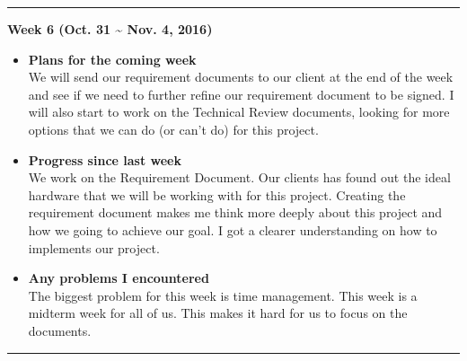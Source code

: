 		\rule{\textwidth}{0.5pt}

		\begin{center}
			\textbf{Week 6 (Oct. 31 {\textasciitilde{}} Nov. 4, 2016)}
		\end{center}
		\begin{itemize}
			\item \textbf{Plans for the coming week}
			\\We will send our requirement documents to our client at the end of the week and see if we need to further refine our requirement document to be signed. I will also start to work on the Technical Review documents, looking for more options that we can do (or can't do) for this project.\\

			\item \textbf{Progress since last week}
			\\We work on the Requirement Document. Our clients has found out the ideal hardware that we will be working with for this project. Creating the requirement document makes me think more deeply about this project and how we going to achieve our goal. I got a clearer understanding on how to implements our project.\\

			\item \textbf{Any problems I encountered}
			\\The biggest problem for this week is time management. This week is a midterm week for all of us. This makes it hard for us to focus on the documents.\\
		\end{itemize}

		\rule{\textwidth}{0.5pt}

